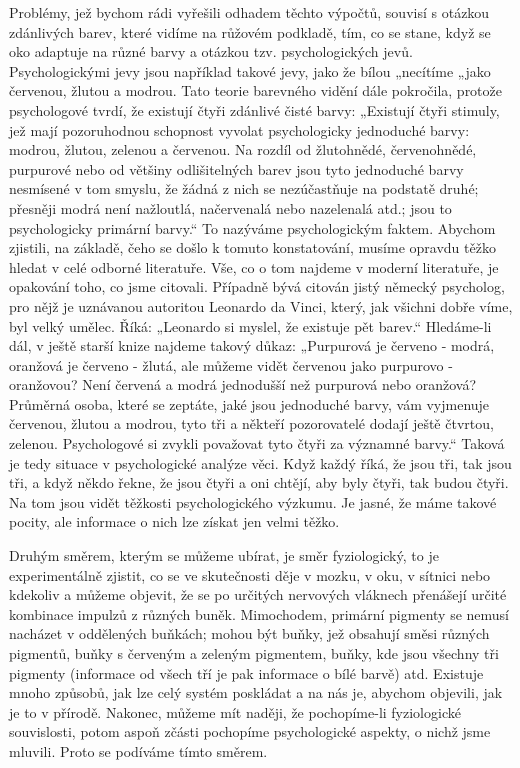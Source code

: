     Problémy, jež bychom rádi vyřešili odhadem těchto výpočtů, souvisí s otázkou zdánlivých barev,
    které vidíme na růžovém podkladě, tím, co se stane, když se oko adaptuje na různé barvy a
    otázkou tzv. psychologických jevů. Psychologickými jevy jsou například takové jevy, jako že
    bílou „necítíme „jako červenou, žlutou a modrou. Tato teorie barevného vidění dále pokročila,
    protože psychologové tvrdí, že existují čtyři zdánlivé čisté barvy: „Existují čtyři stimuly, jež
    mají pozoruhodnou schopnost vyvolat psychologicky jednoduché barvy: modrou, žlutou, zelenou a
    červenou. Na rozdíl od žlutohnědé, červenohnědé, purpurové nebo od většiny odlišitelných barev
    jsou tyto jednoduché barvy nesmísené v tom smyslu, že žádná z nich se nezúčastňuje na podstatě
    druhé; přesněji modrá není nažloutlá, načervenalá nebo nazelenalá atd.; jsou to psychologicky
    primární barvy.“ To nazýváme psychologickým faktem. Abychom zjistili, na základě, čeho se došlo
    k tomuto konstatování, musíme opravdu těžko hledat v celé odborné literatuře. Vše, co o tom
    najdeme v moderní literatuře, je opakování toho, co jsme citovali. Případně bývá citován jistý
    německý psycholog, pro nějž je uznávanou autoritou Leonardo da Vinci, který, jak všichni dobře
    víme, byl velký umělec. Říká: „Leonardo si myslel, že existuje pět barev.“ Hledáme-li dál, v
    ještě starší knize najdeme takový důkaz: „Purpurová je červeno - modrá, oranžová je červeno -
    žlutá, ale můžeme vidět červenou jako purpurovo - oranžovou? Není červená a modrá jednodušší než
    purpurová nebo oranžová? Průměrná osoba, které se zeptáte, jaké jsou jednoduché barvy, vám
    vyjmenuje červenou, žlutou a modrou, tyto tři a někteří pozorovatelé dodají ještě čtvrtou,
    zelenou. Psychologové si zvykli považovat tyto čtyři za významné barvy.“ Taková je tedy situace
    v psychologické analýze věci. Když každý říká, že jsou tři, tak jsou tři, a když někdo řekne, že
    jsou čtyři a oni chtějí, aby byly čtyři, tak budou čtyři. Na tom jsou vidět těžkosti
    psychologického výzkumu. Je jasné, že máme takové pocity, ale informace o nich lze získat jen
    velmi těžko.

    Druhým směrem, kterým se můžeme ubírat, je směr fyziologický, to je experimentálně zjistit, co
    se ve skutečnosti děje v mozku, v oku, v sítnici nebo kdekoliv a můžeme objevit, že se po
    určitých nervových vláknech přenášejí určité kombinace impulzů z různých buněk. Mimochodem,
    primární pigmenty se nemusí nacházet v oddělených buňkách; mohou být buňky, jež obsahují směsi
    různých pigmentů, buňky s červeným a zeleným pigmentem, buňky, kde jsou všechny tři pigmenty
    (informace od všech tří je pak informace o bílé barvě) atd. Existuje mnoho způsobů, jak lze celý
    systém poskládat a na nás je, abychom objevili, jak je to v přírodě. Nakonec, můžeme mít naději,
    že pochopíme-li fyziologické souvislosti, potom aspoň zčásti pochopíme psychologické aspekty, o
    nichž jsme mluvili. Proto se podíváme tímto směrem.

